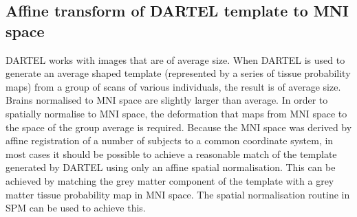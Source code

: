 \subsection{Affine transform of DARTEL template to MNI space}
DARTEL works with images that are of average size.
When DARTEL is used to generate an average shaped template (represented by a series of tissue probability maps) from a group of scans of various individuals, the result is of average size.
Brains normalised to MNI space are slightly larger  than average.
In order to spatially normalise to MNI space, the deformation that maps from MNI space to the space of the group average is required.
Because the MNI space was derived by affine registration of a number of subjects to a common coordinate system, in most cases it should be possible to achieve a reasonable match of the template generated by DARTEL using only an affine spatial normalisation.
This can be achieved by matching the grey matter component of the template with a grey matter tissue probability map in MNI space.
The spatial normalisation routine in SPM can be used to achieve this.

